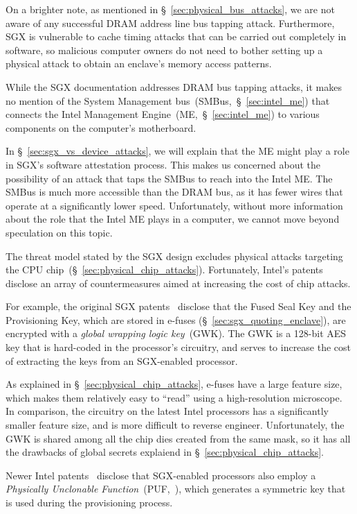 On a brighter note, as mentioned in \S~\ref{sec:physical_bus_attacks}, we are
not aware of any successful DRAM address line bus tapping attack. Furthermore,
SGX is vulnerable to cache timing attacks that can be carried out completely in
software, so malicious computer owners do not need to bother setting up a
physical attack to obtain an enclave's memory access patterns.

While the SGX documentation addresses DRAM bus tapping attacks, it makes no
mention of the System Management bus~(SMBus,~\S~\ref{sec:intel_me}) that
connects the Intel Management Engine~(ME,~\S~\ref{sec:intel_me}) to various
components on the computer's motherboard.

In \S~\ref{sec:sgx_vs_device_attacks}, we will explain that the ME might play a
role in SGX's software attestation process. This makes us concerned about the
possibility of an attack that taps the SMBus to reach into the Intel ME. The
SMBus is much more accessible than the DRAM bus, as it has fewer wires that
operate at a significantly lower speed. Unfortunately, without more information
about the role that the Intel ME plays in a computer, we cannot move beyond
speculation on this topic.

The threat model stated by the SGX design excludes physical attacks targeting
the CPU chip~(\S~\ref{sec:physical_chip_attacks}). Fortunately, Intel's patents
disclose an array of countermeasures aimed at increasing the cost of chip
attacks.

For example, the original SGX patents~\cite{intel2013patent1, intel2013patent2}
disclose that the Fused Seal Key and the Provisioning Key, which are stored in
e-fuses (\S~\ref{sec:sgx_quoting_enclave}), are encrypted with a \textit{global
wrapping logic key}~(GWK). The GWK is a 128-bit AES key that is hard-coded in
the processor's circuitry, and serves to increase the cost of extracting the
keys from an SGX-enabled processor.

As explained in \S~\ref{sec:physical_chip_attacks}, e-fuses have a large
feature size, which makes them relatively easy to ``read'' using a
high-resolution microscope. In comparison, the circuitry on the latest Intel
processors has a significantly smaller feature size, and is more difficult to
reverse engineer. Unfortunately, the GWK is shared among all the chip dies
created from the same mask, so it has all the drawbacks of global secrets
explaiend in \S~\ref{sec:physical_chip_attacks}.

Newer Intel patents~\cite{gotze2014provisioning, gotze2014provisioning2}
disclose that SGX-enabled processors also employ a
\textit{Physically Unclonable Function}~(PUF,~\cite{suh2007puf}), which
generates a symmetric key that is used during the provisioning process.


